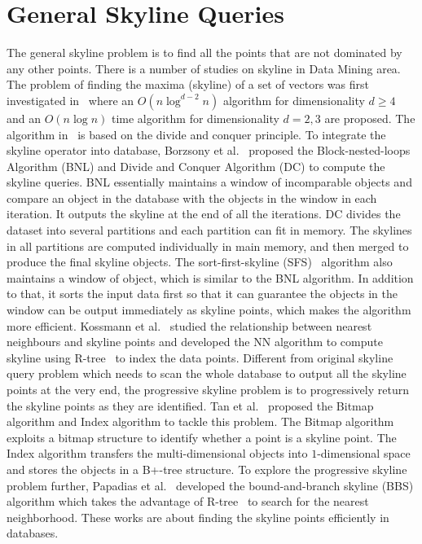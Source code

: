 \section{General Skyline Queries}
\label{sec:rel:general}
The general skyline problem is to find all the points that are not dominated by any other points.
There is a number of studies on skyline in Data Mining area. The problem of finding the maxima (skyline) of a set of vectors was first investigated in~\cite{kung1975finding} where an $O(n\log ^{d-2}n)$ algorithm for dimensionality $d\geq 4$ and an $O(n\log n)$ time algorithm for dimensionality $d = 2, 3$ are proposed. The algorithm in~\cite{kung1975finding} is based on the divide and conquer principle. To integrate the skyline operator into database, Borzsony et al.~\cite{borzsony2001skyline} proposed the Block-nested-loops Algorithm (BNL) and Divide and Conquer Algorithm (DC) to compute the skyline queries.
BNL essentially maintains a window of incomparable objects and compare an object in the database with the objects in the window in each iteration. It outputs the skyline at the end of all the iterations. DC divides the dataset into several partitions and each partition can fit in memory. The skylines in all partitions are computed individually in main memory, and then merged to produce the final skyline objects. 
The sort-first-skyline (SFS)~\cite{chomicki2003skyline} algorithm also maintains a window of object, which is similar to the BNL algorithm. In addition to that, it sorts the input data first so that it can guarantee the objects in the window can be output immediately as skyline points, which makes the algorithm more efficient.
Kossmann et al.~\cite{kossmann2002shooting} studied the relationship between nearest neighbours and skyline points and developed the NN algorithm to compute skyline using R-tree~\cite{beckmann1990r, guttman1984r} to index the data points.
Different from original skyline query problem which needs to scan the whole database to output all the skyline points at the very end, the progressive skyline problem is to progressively return the skyline points as they are identified. Tan et al.~\cite{tan2001efficient} proposed the Bitmap algorithm and Index algorithm to tackle this problem. The Bitmap algorithm exploits a bitmap structure to identify whether a point is a skyline point. The Index algorithm transfers the multi-dimensional objects into $1$-dimensional space and stores the objects in a B+-tree structure. To explore the progressive skyline problem further, Papadias et al.~\cite{papadias2003optimal, papadias2005progressive} developed the bound-and-branch skyline (BBS) algorithm which takes the advantage of R-tree~\cite{beckmann1990r, guttman1984r} to search for the nearest neighborhood. These works are about finding the skyline points efficiently in databases.

